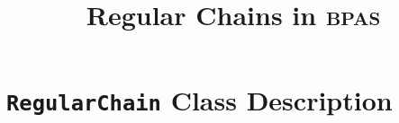 \documentclass{article}
\title{Regular Chains in \textsc{bpas}}
\date{}
\begin{document}
\maketitle{}

\section{\texttt{RegularChain} Class Description}




\end{document}

